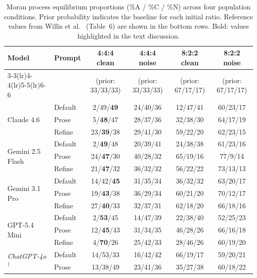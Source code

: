 \begin{table}[t]
\caption{Moran process equilibrium proportions (\%A / \%C / \%N) across
         four population conditions. Prior probability indicates the
         baseline for each initial ratio.
         Reference values from Willis et al.\ \cite{Willis2025_llm_ipd}
         (Table~6) are shown in the bottom rows.
         Bold: values highlighted in the text discussion.}
\label{tab:moran}
\footnotesize
\setlength{\tabcolsep}{3pt}
\begin{tabular}{@{}llcccc@{}}
\toprule
\textbf{Model} & \textbf{Prompt} &
  \textbf{4:4:4 clean} &
  \textbf{4:4:4 noise} &
  \textbf{8:2:2 clean} &
  \textbf{8:2:2 noise} \\
\cmidrule(lr){3-3}\cmidrule(lr){4-4}\cmidrule(lr){5-5}\cmidrule(lr){6-6}
 & & (prior: 33/33/33) & (prior: 33/33/33) & (prior: 67/17/17) & (prior: 67/17/17) \\
\midrule
\multirow{3}{*}{Claude 4.6}
  & Default & 2/49/\textbf{49} & 24/40/36 & 12/47/41 & 60/23/17 \\
  & Prose   & 5/\textbf{48}/47 & 28/37/36 & 32/38/30 & 64/17/19 \\
  & Refine  & 23/\textbf{39}/38 & 29/41/30 & 59/22/20 & 62/23/15 \\
\midrule
\multirow{3}{*}{Gemini 2.5 Flash}
  & Default & 2/\textbf{49}/48 & 20/39/41 & 24/38/38 & 61/23/16 \\
  & Prose   & 24/\textbf{47}/30 & 40/28/32 & 65/19/16 & 77/9/14 \\
  & Refine  & 21/\textbf{47}/32 & 36/32/32 & 56/22/22 & 73/13/13 \\
\midrule
\multirow{3}{*}{Gemini 3.1 Pro}
  & Default & 14/42/\textbf{45} & 31/35/34 & 36/32/32 & 63/20/17 \\
  & Prose   & 19/\textbf{43}/38 & 36/29/34 & 60/21/20 & 70/12/17 \\
  & Refine  & 27/\textbf{40}/33 & 32/37/31 & 62/18/20 & 66/18/16 \\
\midrule
\multirow{3}{*}{GPT-5.4 Mini}
  & Default & 2/\textbf{53}/45 & 14/47/39 & 22/38/40 & 52/25/23 \\
  & Prose   & 12/\textbf{45}/43 & 31/34/35 & 46/28/26 & 66/16/18 \\
  & Refine  & 4/\textbf{70}/26 & 25/42/33 & 28/46/26 & 60/19/20 \\
\midrule
\midrule
\multirow{3}{*}{\textit{ChatGPT-4o}$^\dagger$}
  & Default & 14/53/33 & 16/42/42 & 66/19/17 & 59/20/21 \\
  & Prose   & 13/38/49 & 23/41/36 & 35/27/38 & 60/18/22 \\

\end{tabular}
\end{table}
